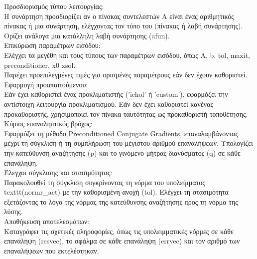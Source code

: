 \documentclass[12pt,a4paper]{article}
\begin{document}
Προσδιορισμός τύπου λειτουργίας:\\
Η συνάρτηση προσδιορίζει αν ο πίνακας συντελεστών A είναι ένας αριθμητικός πίνακας ή μια συνάρτηση, ελέγχοντας τον τύπο του (πίνακας ή λαβή συνάρτησης).
Ορίζει ανάλογα μια κατάλληλη λαβή συνάρτησης (afun).\\

Επικύρωση παραμέτρων εισόδου:\\
Ελέγχει τα μεγέθη και τους τύπους των παραμέτρων εισόδου, όπως A, b, tol, maxit, preconditioner, x0 xsol.\\
Παρέχει προεπιλεγμένες τιμές για ορισμένες παραμέτρους εάν δεν έχουν καθοριστεί.\\

Εφαρμογή προαπαιτούμενου:\\
Εάν έχει καθοριστεί ένας προκλιματιστής ('ichol' ή 'custom'), εφαρμόζει την αντίστοιχη λειτουργία προκλιματισμού.
Εάν δεν έχει καθοριστεί κανένας προκαθοριστής, χρησιμοποιεί τον πίνακα ταυτότητας ως προκαθοριστή τοποθέτησης.\\

Κύριος επαναληπτικός βρόχος:\\
Εφαρμόζει τη μέθοδο Preconditioned Conjugate Gradients, επαναλαμβάνοντας μέχρι τη σύγκλιση ή τη συμπλήρωση του μέγιστου αριθμού επαναλήψεων.
Υπολογίζει την κατεύθυνση αναζήτησης (p) και το γινόμενο μήτρας-διανύσματος (q) σε κάθε επανάληψη.\\

Έλεγχοι σύγκλισης και στασιμότητας:\\
Παρακολουθεί τη σύγκλιση συγκρίνοντας τη νόρμα του υπολείμματος texttt{(normr\_act)} με την καθορισμένη ανοχή (tol).
Ελέγχει τη στασιμότητα εξετάζοντας το λόγο της νόρμας της κατεύθυνσης αναζήτησης προς τη νόρμα της λύσης.\\

Αποθήκευση αποτελεσμάτων:\\
Καταγράφει τις σχετικές πληροφορίες, όπως τις υπολειμματικές νόρμες σε κάθε επανάληψη (resvec), το σφάλμα σε κάθε επανάληψη (errvec) και τον αριθμό των επαναλήψεων που εκτελέστηκαν.\\
\end{document}
